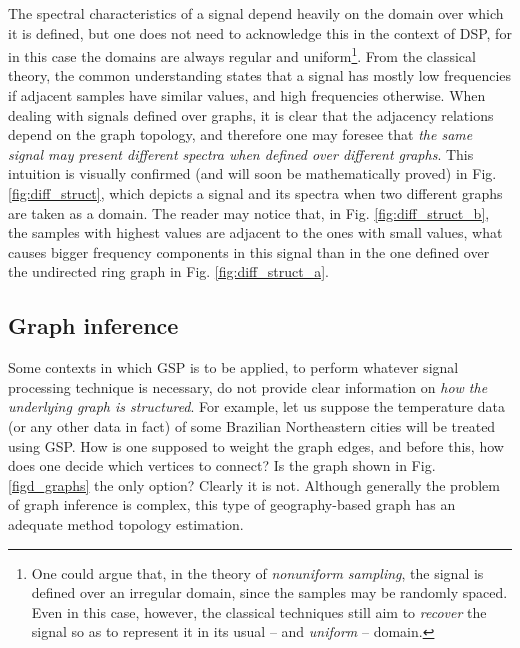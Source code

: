 The spectral characteristics of a signal depend heavily on the domain over which it is defined, but one does not need to acknowledge this in the context of DSP, for in this case the domains are always regular and uniform\footnote{One could argue that, in the theory of \emph{nonuniform sampling}, the signal is defined over an irregular domain, since the samples may be randomly spaced. Even in this case, however, the classical techniques still aim to \emph{recover} the signal so as to represent it in its usual -- and \emph{uniform} -- domain.
}.
From the classical theory, the common understanding states that a signal has mostly low frequencies if adjacent samples have similar values, and high frequencies otherwise. When dealing with signals defined over graphs, it is clear that the adjacency relations depend on the graph topology, and therefore one may foresee that \emph{the same signal may present different spectra when defined over different graphs}. This intuition is visually confirmed (and will soon be mathematically proved) in Fig. \ref{fig:diff_struct}, which depicts a signal and its spectra when two different graphs are taken as a domain. The reader may notice that, in Fig. \ref{fig:diff_struct_b}, the samples with highest values are adjacent to the ones with small values, what causes bigger frequency components in this signal than in the one defined over the undirected ring graph in Fig. \ref{fig:diff_struct_a}.

\subsection{Graph inference}
\label{subsec:inferindo}

Some contexts in which GSP is to be applied, to perform whatever signal processing technique is necessary, do not provide clear information on \emph{how the underlying graph is structured}. For example, let us suppose the temperature data (or any other data in fact) of some Brazilian Northeastern cities will be treated using GSP. How is one supposed to weight the graph edges, and before this, how does one decide which vertices to connect? Is the graph shown in Fig. \ref{figd_graphs} the only option? Clearly it is not. Although generally the problem of graph inference is complex, this type of geography-based graph has an adequate method topology estimation.

